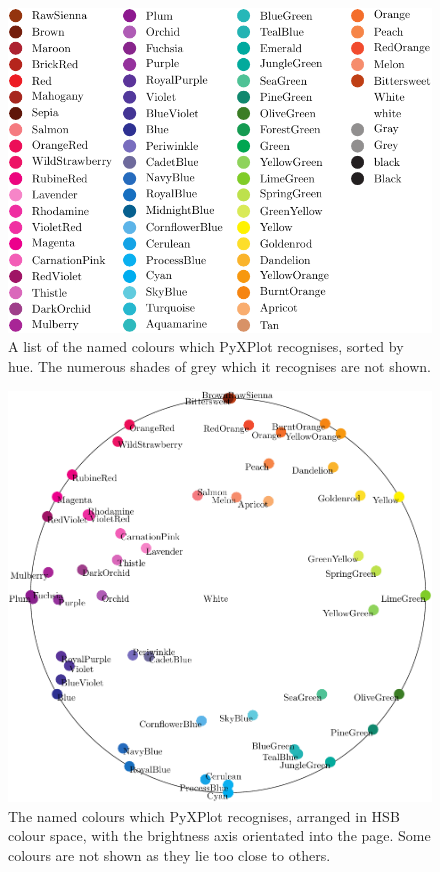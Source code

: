\begin{figure}
\begin{center}
\includegraphics[width=\textwidth]{figures/pyx_colours3}
\end{center}
\caption[A list of the named colours which PyXPlot recognises, sorted by hue]
{A list of the named colours which PyXPlot recognises, sorted by hue. The numerous shades of grey which it recognises are not shown.}
\label{fig:colour_table2}
\end{figure}

\begin{figure}
\begin{center}
\includegraphics[width=\textwidth]{figures/pyx_colours}
\end{center}
\caption[The named colours which PyXPlot recognises, arranged in HSB colour space]
{The named colours which PyXPlot recognises, arranged in HSB colour space, with the brightness axis orientated into the page. Some colours are not shown as they lie too close to others.}
\label{fig:colour_table3}
\end{figure}

